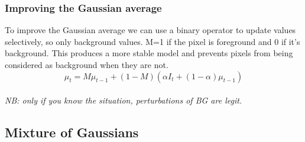 \subsubsection{Improving the Gaussian average}
To improve the Gaussian average we can use a binary operator to update values selectively, so only background values. M=1 if the pixel is foreground and 0 if it's background. This produces a more stable model and prevents pixels from being considered as background when they are not.
\[
    \mu_{t} = M\mu_{t-1} + (1-M)(\alpha I_t + (1-\alpha)\mu_{t-1})
\]
\\\textit{NB: only if you know the situation, perturbations of BG are legit.}
\subsection{Mixture of Gaussians}

